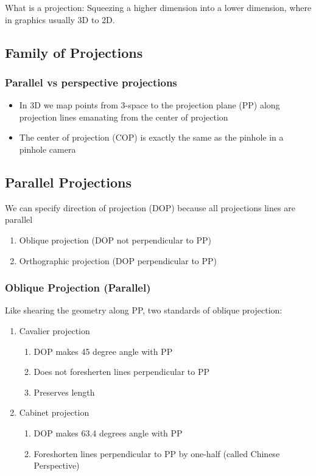 \documentclass[11pt]{article}
\begin{document}
What is a projection:
Squeezing a higher dimension into a lower dimension, where in graphics usually 3D to 2D.


\subsection{Family of Projections}
\subsubsection*{Parallel vs perspective projections}
\begin{itemize}
    \item In 3D we map points from 3-space to the projection plane (PP) along projection lines emanating from the center of projection
    \item The center of projection (COP) is exactly the same as the pinhole in a pinhole camera
\end{itemize}%



\subsection{Parallel Projections}
We can specify direction of projection (DOP) because all projections lines are parallel
\begin{enumerate}
    \item Oblique projection (DOP not perpendicular to PP) 
    \item Orthographic projection (DOP perpendicular to PP)
\end{enumerate}

\subsubsection*{Oblique Projection (Parallel)}
Like shearing the geometry along PP, two standards of oblique projection:
\begin{enumerate}
    \item Cavalier projection \begin{enumerate}
        \item DOP makes 45 degree angle with PP
        \item Does not foresherten lines perpendicular to PP
        \item Preserves length
    \end{enumerate}
    \item Cabinet projection \begin{enumerate}
        \item DOP makes 63.4 degrees angle with PP
        \item Foreshorten lines perpendicular to PP by one-half (called Chinese Perspective)
    \end{enumerate} 
\end{enumerate}
\end{document}
